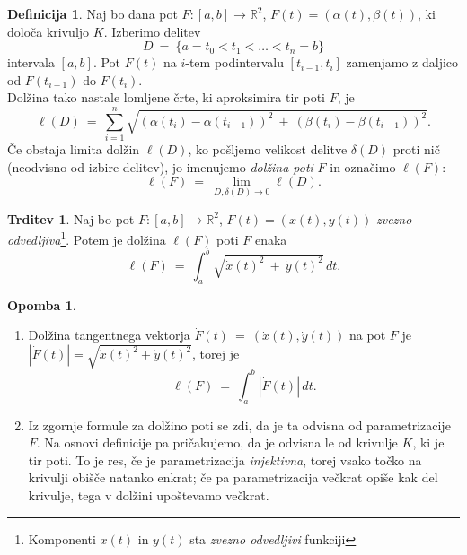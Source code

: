 \documentclass[11pt]{article}
\newcommand{\R}{\mathbb{R}}
\theoremstyle{definition}
\newtheorem{definicija}{Definicija}[section]
\theoremstyle{definition}
\newtheorem{trditev}{Trditev}[section]
\theoremstyle{definition}
\theoremstyle{theorem}
\newtheorem*{opomba}{Opomba}
\begin{document}
\begin{definicija}

Naj bo dana pot $F:[a, b] \rightarrow \mathbb{R}^2$, $F(t) = (\alpha(t), \beta(t))$, ki določa krivuljo $K$. Izberimo delitev
$$D ~=~ \{a = t_0 < t_1 < \ldots < t_n = b\}$$
intervala $[a, b]$. Pot $F(t)$ na $i$-tem podintervalu $[t_{i-1}, t_i]$ zamenjamo z daljico od $F(t_{i-1})$ do $F(t_i)$. \\
Dolžina tako nastale lomljene črte, ki aproksimira tir poti $F$, je 
$$\ell(D) ~=~ \sum_{i = 1}^{n} \sqrt{ (\alpha(t_i) - \alpha(t_{i-1}))^2 ~+~ (\beta(t_i) - \beta(t_{i-1}))^2 }.$$
Če obstaja limita dolžin $\ell(D)$, ko pošljemo velikost delitve $\delta(D)$ proti nič (neodvisno od izbire delitev), jo imenujemo \textit{dolžina poti} $F$ in označimo $\ell(F)$:
$$\ell(F) ~=~ \lim_{D,\delta(D) \rightarrow 0} \ell(D).$$

\end{definicija}
\vspace{0.5cm}

\begin{trditev}

Naj bo pot $F: [a, b] \rightarrow \R^2$, $F(t) = (x(t), y(t))$ \textit{zvezno odvedljiva}\footnote{Komponenti $x(t)$ in $y(t)$ sta \textit{zvezno odvedljivi} funkciji}. Potem je dolžina $\ell(F)$ poti $F$ enaka
$$\ell(F) ~=~ \int_a^b \sqrt{\dot{x}(t)^2 ~+~ \dot{y}(t)^2}\,dt.$$

\end{trditev}
\vspace{0.5cm}

\begin{opomba}
~
\begin{enumerate}
	\item Dolžina tangentnega vektorja $\dot{F}(t) ~=~ (\dot{x}(t), \dot{y}(t))$ na pot $F$ je \\$|\dot{F}(t)| = \sqrt{\dot{x}(t)^2 + \dot{y}(t)^2}$, torej je
	$$\ell(F) ~=~ \int_a^b |\dot{F}(t)|\,dt.$$
	
	\item Iz zgornje formule za dolžino poti se zdi, da je ta odvisna od parametrizacije $F$. Na osnovi definicije pa pričakujemo, da je odvisna le od krivulje $K$, ki je tir poti. To je res, če je parametrizacija \textit{injektivna}, torej vsako točko na krivulji obišče natanko enkrat; če pa parametrizacija večkrat opiše kak del krivulje, tega v dolžini upoštevamo večkrat.
\end{enumerate}
\end{opomba}
\vspace{0.5cm}
\end{document}
